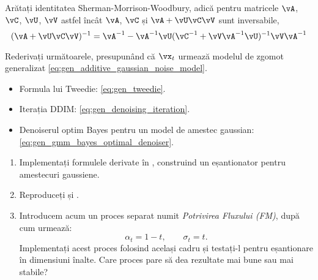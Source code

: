 \documentclass[../../book-main_ro.tex]{subfiles}
\begin{document}
\begin{exercise}\label{exercise:sherman_morrison_woodbury_identity}
    Arătați identitatea Sherman-Morrison-Woodbury, adică pentru matricele \(\vA\), \(\vC\), \(\vU\), \(\vV\) astfel încât \(\vA\), \(\vC\) și \(\vA + \vU\vC\vV\) sunt inversabile,
    \begin{equation}
        (\vA + \vU\vC\vV)^{-1} = \vA^{-1} - \vA^{-1}\vU(\vC^{-1} + \vV\vA^{-1}\vU)^{-1}\vV\vA^{-1}
    \end{equation}
\end{exercise}

\begin{exercise}\label{exercise:generalizing_results_to_different_noise_models}
    Rederivați următoarele, presupunând că \(\vx_{t}\) urmează modelul de zgomot generalizat \eqref{eq:gen_additive_gaussian_noise_model}.
    \begin{itemize}
        \item Formula lui Tweedie: \eqref{eq:gen_tweedie}.
        \item Iterația DDIM: \eqref{eq:gen_denoising_iteration}.
        \item Denoiserul optim Bayes pentru un model de amestec gaussian: \eqref{eq:gen_gmm_bayes_optimal_denoiser}.
    \end{itemize}
\end{exercise}

\begin{exercise}\label{exercise:implement_denoising_processes}
\begin{enumerate}
    \item Implementați formulele derivate în , construind un eșantionator pentru amestecuri gaussiene.
    \item Reproduceți  și .
    \item Introducem acum un proces separat numit \textit{Potrivirea Fluxului (FM)}, după cum urmează:
    \begin{equation}
        \alpha_{t} = 1 - t, \qquad \sigma_{t} = t.
    \end{equation}
    Implementați acest proces folosind același cadru și testați-l pentru eșantionare în dimensiuni înalte. Care proces pare să dea rezultate mai bune sau mai stabile?
\end{enumerate}
\end{exercise}
\end{document}
